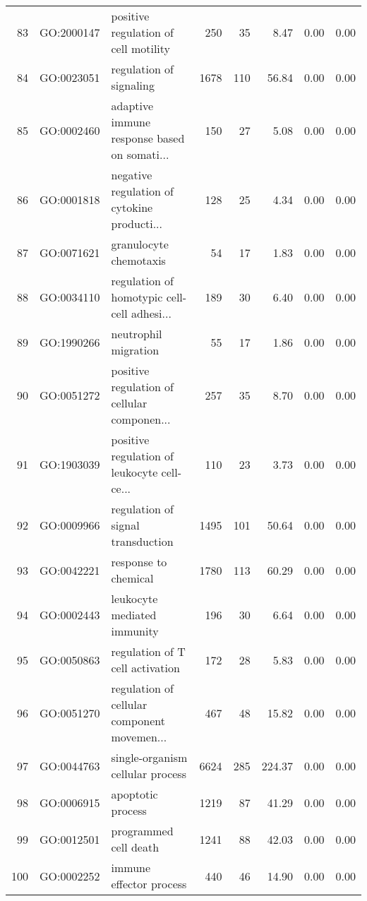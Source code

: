 \begin{table}[ht]
\begin{tabular}{rllrrrrr}
  83 & GO:2000147 & positive regulation of cell motility & 250 &  35 & 8.47 & 0.00 & 0.00 \\ 
  84 & GO:0023051 & regulation of signaling & 1678 & 110 & 56.84 & 0.00 & 0.00 \\ 
  85 & GO:0002460 & adaptive immune response based on somati... & 150 &  27 & 5.08 & 0.00 & 0.00 \\ 
  86 & GO:0001818 & negative regulation of cytokine producti... & 128 &  25 & 4.34 & 0.00 & 0.00 \\ 
  87 & GO:0071621 & granulocyte chemotaxis &  54 &  17 & 1.83 & 0.00 & 0.00 \\ 
  88 & GO:0034110 & regulation of homotypic cell-cell adhesi... & 189 &  30 & 6.40 & 0.00 & 0.00 \\ 
  89 & GO:1990266 & neutrophil migration &  55 &  17 & 1.86 & 0.00 & 0.00 \\ 
  90 & GO:0051272 & positive regulation of cellular componen... & 257 &  35 & 8.70 & 0.00 & 0.00 \\ 
  91 & GO:1903039 & positive regulation of leukocyte cell-ce... & 110 &  23 & 3.73 & 0.00 & 0.00 \\ 
  92 & GO:0009966 & regulation of signal transduction & 1495 & 101 & 50.64 & 0.00 & 0.00 \\ 
  93 & GO:0042221 & response to chemical & 1780 & 113 & 60.29 & 0.00 & 0.00 \\ 
  94 & GO:0002443 & leukocyte mediated immunity & 196 &  30 & 6.64 & 0.00 & 0.00 \\ 
  95 & GO:0050863 & regulation of T cell activation & 172 &  28 & 5.83 & 0.00 & 0.00 \\ 
  96 & GO:0051270 & regulation of cellular component movemen... & 467 &  48 & 15.82 & 0.00 & 0.00 \\ 
  97 & GO:0044763 & single-organism cellular process & 6624 & 285 & 224.37 & 0.00 & 0.00 \\ 
  98 & GO:0006915 & apoptotic process & 1219 &  87 & 41.29 & 0.00 & 0.00 \\ 
  99 & GO:0012501 & programmed cell death & 1241 &  88 & 42.03 & 0.00 & 0.00 \\ 
  100 & GO:0002252 & immune effector process & 440 &  46 & 14.90 & 0.00 & 0.00 \\ 
   \hline
\end{tabular}
\end{table}
